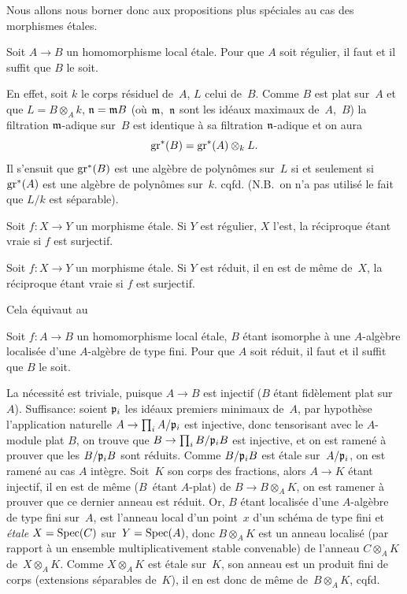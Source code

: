 Nous allons nous borner donc aux propositions plus sp\'eciales au
cas des morphismes \'etales.

\begin{proposition}
\label{I.9.1}
Soit $A\to B$ un homomorphisme local \'etale. Pour que $A$ soit
r\'egulier, il faut et il suffit que $B$ le soit.
\end{proposition}
En effet, soit $k$ le corps r\'esiduel de~$A$, $L$ celui de~$B$.
Comme $B$ est plat sur~$A$ et que
$L=B\otimes_A k$,
\ie $\mathfrak{n}=\mathfrak{m}B$ (o\`u $\mathfrak{m}$,~$\mathfrak{n}$ sont les
id\'eaux maximaux de~$A$,~$B$) la filtration $\mathfrak{m}$-adique sur~$B$ est identique \`a sa filtration $\mathfrak{n}$-adique et on aura
$$
\operatorname{gr}^*(B)=\operatorname{gr}^*(A)\otimes_k L.
$$
Il s'ensuit que $\operatorname{gr}^*(B)$ est une alg\`ebre de polyn\^omes sur~$L$ si et seulement si $\operatorname{gr}^*(A)$ est une alg\`ebre de polyn\^omes
sur~$k$. cqfd. (N.B.\ on n'a pas utilis\'e le fait que $L/k$ est
s\'eparable).

\begin{corollaire}
\label{I.9.2}
Soit $f\colon X\to Y$ un morphisme \'etale. Si $Y$ est
r\'egulier, $X$ l'est, la r\'eciproque \'etant vraie si $f$ est
surjectif.
\end{corollaire}

\setcounter{subsection}{1}

\begin{proposition}
\label{prop:I.9.2}
Soit $f\colon X\to Y$ un morphisme \'etale. Si $Y$ est r\'eduit,
il en est de m\^eme de~$X$, la r\'eciproque \'etant vraie si $f$
est surjectif.
\end{proposition}

Cela \'equivaut au
\begin{corollaire}
\label{I.9.3}
Soit $f\colon A\to B$ un homomorphisme local \'etale, $B$ \'etant
isomorphe \`a une
$A$-alg\`ebre localis\'ee d'une $A$-alg\`ebre de type fini.
Pour que $A$ soit r\'eduit, il faut et il suffit que $B$ le soit.
\end{corollaire}

La n\'ecessit\'e est triviale, puisque $A\to B$ est injectif ($B$
\'etant fid\`element plat sur~$A$). Suffisance: soient
$\mathfrak{p}_i$ les id\'eaux premiers minimaux de~$A$, par
hypoth\`ese l'application naturelle $A\to\prod_i A/\goth{p}_i$ est
injective, donc tensorisant avec le $A$-module plat $B$, on trouve que
$B\to\prod_i B/\goth{p}_iB$ est injective, et on est ramen\'e \`a
prouver que les $B/\mathfrak{p}_iB$ sont r\'eduits. Comme
$B/\mathfrak{p}_iB$ est \'etale sur~$A/\mathfrak{p}_i$,
on est ramen\'e au
cas $A$ int\`egre. Soit~$K$ son corps des fractions, alors $A\to K$
\'etant injectif, il en est de m\^eme ($B$~\'etant $A$-plat) de
$B\to B\otimes_A K$, on est ramener \`a prouver que ce dernier
anneau est r\'eduit. Or, $B$ \'etant localis\'ee d'une
$A$-alg\`ebre de type fini sur~$A$, est l'anneau local d'un point~$x$ d'un sch\'ema de type fini et \emph{étale} $X=\operatorname{Spec}(C)$ sur~$Y=\operatorname{Spec}(A)$, donc $B\otimes_A K$ est un anneau localis\'e (par
rapport \`a un ensemble multiplicativement stable convenable) de
l'anneau $C\otimes_A K$ de~$X\otimes_A K$. Comme $X\otimes_A K$ est
\'etale sur~$K$, son anneau est un produit fini de corps (extensions
s\'eparables de~$K$), il en est donc de m\^eme de~$B\otimes_A
K$, cqfd.

